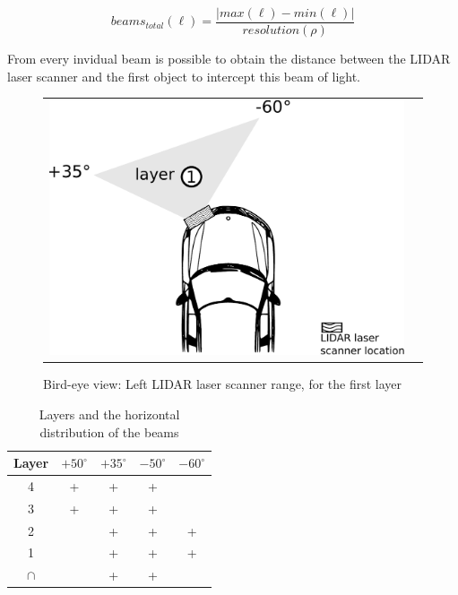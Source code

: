 \begin{equation}
\label{eq:totalbeams}
beams_{total}(\ell)=\frac{|max(\ell)-min(\ell)|}{resolution(\rho)}
\end{equation}


From every invidual beam is possible to obtain the distance between the LIDAR laser scanner and the first object to intercept this beam of light.

\begin{figure}[h]
   \centering
     \begin{tabular}{lr}
       \includegraphics[scale=0.5]{img/fig:demonstrator:superior}
     \end{tabular}
   \caption{Bird-eye view: Left LIDAR laser scanner range, for the first layer}
   \label{fig:demonstrator:superior}
\end{figure}


\begin{table}
\label{tab:beam:interception}
	\begin{center}
	    \begin{tabular}{ | c | c | c | c | c |}
		    \hline
		    Layer & $+50^\circ$ & $+35^\circ$ & $-50^\circ$ & $-60^\circ$ \\ \hline
		    4 & + & + & + &  \\ \hline
		    3 & + & + & + &  \\ \hline
		    2 &  & + & + & + \\ \hline
		    1 &  & + & + & + \\ \hline
		    $\cap$ &  & + & + &  \\ \hline
	    \end{tabular}
	\end{center}
    \caption{Layers and the horizontal distribution of the beams}
\end{table}


